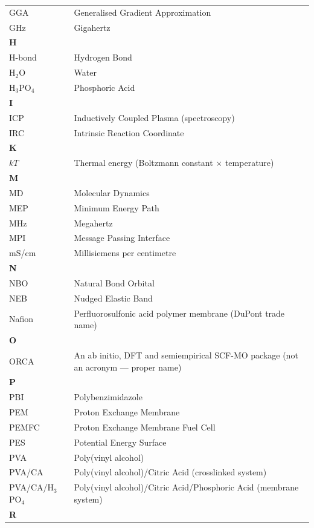 \documentclass[12pt,a4paper]{report}
\begin{document}
\begin{center}
\begin{longtable}{p{2.5cm} p{12cm}}
\hline
GGA & Generalised Gradient Approximation \\
GHz & Gigahertz \\
\hline
\multicolumn{2}{l}{\textbf{H}} \\
\hline
H-bond & Hydrogen Bond \\
H\(_2\)O & Water \\
H\(_3\)PO\(_4\) & Phosphoric Acid \\
\hline
\multicolumn{2}{l}{\textbf{I}} \\
\hline
ICP & Inductively Coupled Plasma (spectroscopy) \\
IRC & Intrinsic Reaction Coordinate \\
\hline
\multicolumn{2}{l}{\textbf{K}} \\
\hline
\(kT\) & Thermal energy (Boltzmann constant \(\times\) temperature) \\
\hline
\multicolumn{2}{l}{\textbf{M}} \\
\hline
MD & Molecular Dynamics \\
MEP & Minimum Energy Path \\
MHz & Megahertz \\
MPI & Message Passing Interface \\
mS/cm & Millisiemens per centimetre \\
\hline
\multicolumn{2}{l}{\textbf{N}} \\
\hline
NBO & Natural Bond Orbital \\
NEB & Nudged Elastic Band \\
Nafion & Perfluorosulfonic acid polymer membrane (DuPont trade name) \\
\hline
\multicolumn{2}{l}{\textbf{O}} \\
\hline
ORCA & An ab initio, DFT and semiempirical SCF-MO package (not an acronym — proper name) \\
\hline
\multicolumn{2}{l}{\textbf{P}} \\
\hline
PBI & Polybenzimidazole \\
PEM & Proton Exchange Membrane \\
PEMFC & Proton Exchange Membrane Fuel Cell \\
PES & Potential Energy Surface \\
PVA & Poly(vinyl alcohol) \\
PVA/CA & Poly(vinyl alcohol)/Citric Acid (crosslinked system) \\
PVA/CA/H\(_3\)PO\(_4\) & Poly(vinyl alcohol)/Citric Acid/Phosphoric Acid (membrane system) \\
\hline
\multicolumn{2}{l}{\textbf{R}} \\

\end{longtable}
\end{center}
\end{document}
